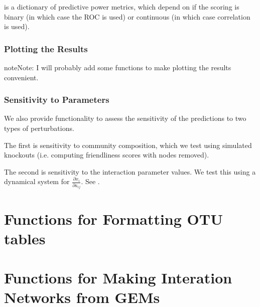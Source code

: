\documentclass[letterpaper,10pt,english]{sphinxmanual}
\begin{document}
\sphinxAtStartPar
{} is a dictionary of predictive power metrics, which depend on if the scoring is binary (in which case the ROC is used) or continuous (in which case correlation is used).


\subsection{Plotting the Results}
\label{\detokenize{usage:plotting-the-results}}
\begin{sphinxadmonition}{note}{Note:}
\sphinxAtStartPar
I will probably add some functions to make plotting the results convenient.
\end{sphinxadmonition}


\subsection{Sensitivity to Parameters}
\label{\detokenize{usage:sensitivity-to-parameters}}
\sphinxAtStartPar
We also provide functionality to assess the sensitivity of the predictions to two types of perturbations.

\sphinxAtStartPar
The first is sensitivity to community composition, which we test using simulated knock\sphinxhyphen{}outs (i.e. computing friendliness scores with nodes removed).

\sphinxAtStartPar
The second is sensitivity to the interaction parameter values. We test this using a dynamical system for \(\frac{\partial x_i}{\partial a_{ij}}\). See {\hyperref[\detokenize{sensit::doc}]{}}.

\sphinxstepscope


\chapter{Functions for Formatting OTU tables}
\label{\detokenize{format:functions-for-formatting-otu-tables}}\label{\detokenize{format::doc}}
\sphinxstepscope


\chapter{Functions for Making Interation Networks from GEMs}
\label{\detokenize{network_build:functions-for-making-interation-networks-from-gems}}\label{\detokenize{network_build::doc}}
\end{document}
